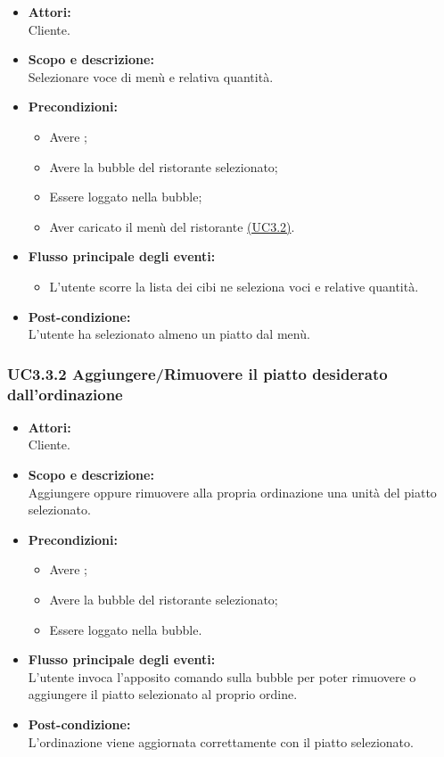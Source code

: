 \begin{itemize}
	\item \textbf{Attori:}
	\\Cliente.
	\item \textbf{Scopo e descrizione:} 
	\\Selezionare voce di menù e relativa quantità.
	\item \textbf{Precondizioni:}
	\begin{itemize}
		\item Avere ;
		\item Avere la bubble del ristorante selezionato;
		\item Essere loggato nella bubble;
		\item Aver caricato il menù del ristorante \hyperref[UC3.2]{(UC3.2)}.
	\end{itemize}
	\item \textbf{Flusso principale degli eventi:}
	\begin{itemize}
		\item L'utente scorre la lista dei cibi ne seleziona voci e relative quantità.
	\end{itemize}
	\item \textbf{Post-condizione:}
	\\L’utente ha selezionato almeno un piatto dal menù.
\end{itemize}

\subsubsection{UC3.3.2 Aggiungere/Rimuovere il piatto desiderato dall'ordinazione} \label{UC3.3.2}

\begin{itemize}
	\item \textbf{Attori:}
	\\Cliente.
	\item \textbf{Scopo e descrizione:} 
	\\Aggiungere oppure rimuovere alla propria ordinazione una unità del piatto selezionato.
	\item \textbf{Precondizioni:}
	\begin{itemize}
		\item Avere ;
		\item Avere la bubble del ristorante selezionato;
		\item Essere loggato nella bubble.
	\end{itemize}
	\item \textbf{Flusso principale degli eventi:}
	\\L'utente invoca l'apposito comando sulla bubble per poter rimuovere o aggiungere il piatto selezionato al proprio ordine.
	\item \textbf{Post-condizione:}
	\\L’ordinazione viene aggiornata correttamente con il piatto selezionato.
\end{itemize}

